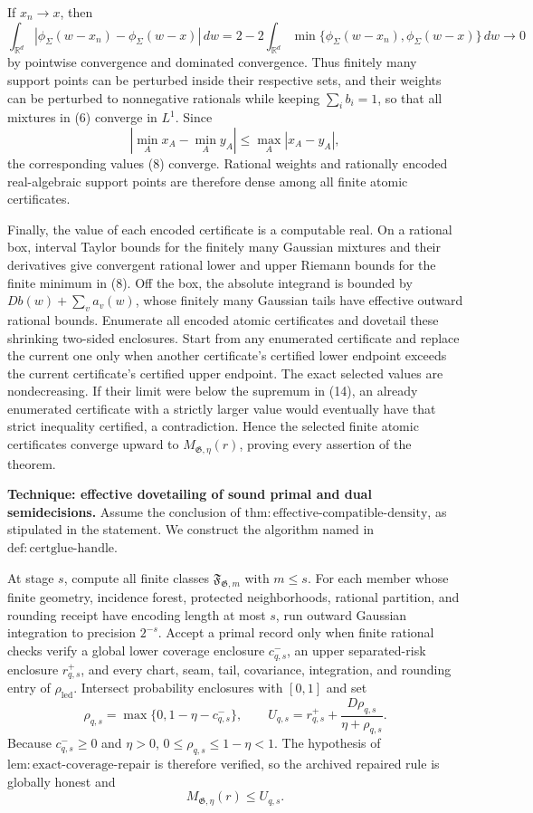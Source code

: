 If \(x_n\to x\), then
\[
 \int_{\mathbb R^d}
 |\phi_\Sigma(w-x_n)-\phi_\Sigma(w-x)|\,dw
 =
 2-2\int_{\mathbb R^d}
 \min\{\phi_\Sigma(w-x_n),\phi_\Sigma(w-x)\}\,dw
 \longrightarrow0
\tag{15}
\]
by pointwise convergence and dominated convergence.  Thus finitely many
support points can be perturbed inside their respective sets, and their
weights can be perturbed to nonnegative rationals while keeping
\(\sum_i b_i=1\), so that all mixtures in (6) converge in \(L^1\).  Since
\[
 \left|\min_A x_A-\min_A y_A\right|
 \leq\max_A|x_A-y_A|,
\tag{16}
\]
the corresponding values (8) converge.  Rational weights and rationally
encoded real-algebraic support points are therefore dense among all finite
atomic certificates.

Finally, the value of each encoded certificate is a computable real.  On a
rational box, interval Taylor bounds for the finitely many Gaussian
mixtures and their derivatives give convergent rational lower and upper
Riemann bounds for the finite minimum in (8).  Off the box, the absolute
integrand is bounded by
\(D b(w)+\sum_v a_v(w)\), whose finitely many Gaussian tails have effective
outward rational bounds.  Enumerate all encoded atomic certificates and
dovetail these shrinking two-sided enclosures.  Start from any enumerated
certificate and replace the current one only when another certificate's
certified lower endpoint exceeds the current certificate's certified upper
endpoint.  The exact selected values are nondecreasing.  If their limit
were below the supremum in (14), an already enumerated certificate with a
strictly larger value would eventually have that strict inequality
certified, a contradiction.  Hence the selected finite atomic certificates
converge upward to \(M_{\mathfrak G,\eta}(r)\), proving every assertion of
the theorem.

\textbf{Technique: effective dovetailing of sound primal and dual
semidecisions.}
Assume the conclusion of
\(\mathrm{thm:effective\mbox{-}compatible\mbox{-}density}\), as stipulated
in the statement.  We construct the algorithm named in
\(\mathrm{def:certglue\mbox{-}handle}\).

At stage \(s\), compute all finite classes
\(\mathfrak F_{\mathfrak G,m}\) with \(m\leq s\).  For each member whose
finite geometry, incidence forest, protected neighborhoods, rational
partition, and rounding receipt have encoding length at most \(s\), run
outward Gaussian integration to precision \(2^{-s}\).  Accept a primal
record only when finite rational checks verify a global lower coverage
enclosure \(c^-_{q,s}\), an upper separated-risk enclosure \(r^+_{q,s}\),
and every chart, seam, tail, covariance, integration, and rounding entry of
\(\rho_{\mathrm{led}}\).  Intersect probability enclosures with \([0,1]\)
and set
\[
 \rho_{q,s}=\max\{0,1-\eta-c^-_{q,s}\},
 \qquad
 U_{q,s}=r^+_{q,s}+
 \frac{D\rho_{q,s}}{\eta+\rho_{q,s}}.
\tag{1}
\]
Because \(c^-_{q,s}\geq0\) and \(\eta>0\),
\(0\leq\rho_{q,s}\leq1-\eta<1\).  The hypothesis of
\(\mathrm{lem:exact\mbox{-}coverage\mbox{-}repair}\) is therefore verified,
so the archived repaired rule is globally honest and
\[
 M_{\mathfrak G,\eta}(r)\leq U_{q,s}.
\tag{2}
\]

